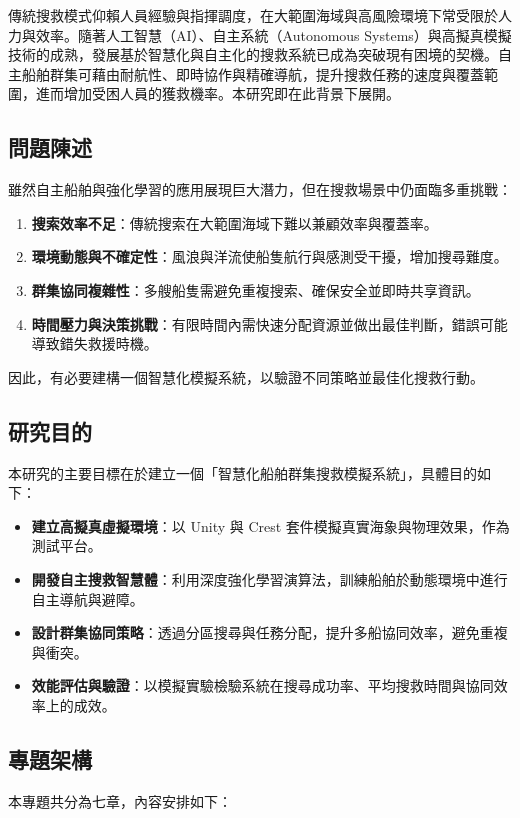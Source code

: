 \documentclass[12pt,a4paper]{ctexart}
\begin{document}
傳統搜救模式仰賴人員經驗與指揮調度，在大範圍海域與高風險環境下常受限於人力與效率。隨著人工智慧（AI）、自主系統（Autonomous Systems）與高擬真模擬技術的成熟，發展基於智慧化與自主化的搜救系統已成為突破現有困境的契機。自主船舶群集可藉由耐航性、即時協作與精確導航，提升搜救任務的速度與覆蓋範圍，進而增加受困人員的獲救機率。本研究即在此背景下展開。

\subsection{問題陳述}
雖然自主船舶與強化學習的應用展現巨大潛力，但在搜救場景中仍面臨多重挑戰：

\begin{enumerate}
\item \textbf{搜索效率不足}：傳統搜索在大範圍海域下難以兼顧效率與覆蓋率。
\item \textbf{環境動態與不確定性}：風浪與洋流使船隻航行與感測受干擾，增加搜尋難度。
\item \textbf{群集協同複雜性}：多艘船隻需避免重複搜索、確保安全並即時共享資訊。
\item \textbf{時間壓力與決策挑戰}：有限時間內需快速分配資源並做出最佳判斷，錯誤可能導致錯失救援時機。
\end{enumerate}

因此，有必要建構一個智慧化模擬系統，以驗證不同策略並最佳化搜救行動。

\subsection{研究目的}
本研究的主要目標在於建立一個「智慧化船舶群集搜救模擬系統」，具體目的如下：

\begin{itemize}
\item \textbf{建立高擬真虛擬環境}：以 Unity 與 Crest 套件模擬真實海象與物理效果，作為測試平台。
\item \textbf{開發自主搜救智慧體}：利用深度強化學習演算法，訓練船舶於動態環境中進行自主導航與避障。
\item \textbf{設計群集協同策略}：透過分區搜尋與任務分配，提升多船協同效率，避免重複與衝突。
\item \textbf{效能評估與驗證}：以模擬實驗檢驗系統在搜尋成功率、平均搜救時間與協同效率上的成效。
\end{itemize}

\subsection{專題架構}
本專題共分為七章，內容安排如下：
\end{document}
